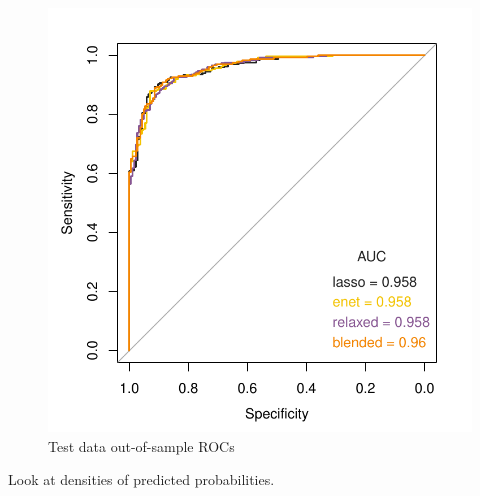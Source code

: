 \documentclass[
]{book}
\begin{document}
\begin{figure}
\centering
\includegraphics{Static/figures/brcaRna-glmnetFit-testROC2-1.pdf}
\caption{\label{fig:brcaRna-glmnetFit-testROC2}Test data out-of-sample ROCs}
\end{figure}

Look at densities of predicted probabilities.
\end{document}
